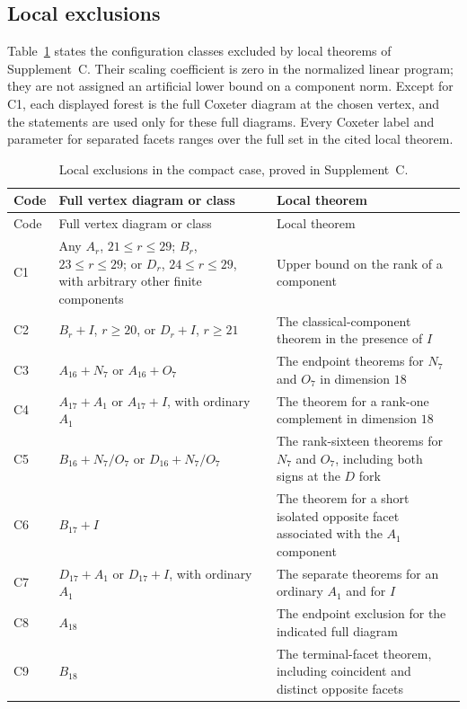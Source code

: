\documentclass[11pt]{article}
\theoremstyle{definition}
\theoremstyle{remark}
\numberwithin{equation}{section}
\begin{document}
\subsection{Local exclusions}
\label{c:local-exits}

Table~\ref{c:local-exit-table} states the configuration classes
excluded by local theorems of Supplement~C. Their scaling coefficient
is zero in the normalized linear program; they are not assigned an
artificial lower bound on a component norm. Except for C1, each displayed forest is the full Coxeter diagram
at the chosen vertex, and the statements are used only for these full diagrams.
Every Coxeter label and parameter for separated facets ranges over
the full set in the cited local theorem.

\begin{longtable}{>{\raggedright\arraybackslash}p{.08\linewidth}
 >{\raggedright\arraybackslash}p{.43\linewidth}
 >{\raggedright\arraybackslash}p{.39\linewidth}}
\caption{Local exclusions in the compact case, proved in Supplement~C.}\label{c:local-exit-table}\\
\toprule
Code&Full vertex diagram or class&Local theorem\\\midrule
\endfirsthead
\toprule Code&Full vertex diagram or class&Local theorem\\\midrule\endhead
C1&Any $A_r$, $21\le r\le29$; $B_r$, $23\le r\le29$;
 or $D_r$, $24\le r\le29$, with arbitrary other finite components&
 Upper bound on the rank of a component\\
C2&$B_r+I$, $r\ge20$, or $D_r+I$, $r\ge21$&
 The classical-component theorem in the presence of $I$\\
C3&$A_{16}+N_7$ or $A_{16}+O_7$&
 The endpoint theorems for $N_7$ and $O_7$ in dimension $18$\\
C4&$A_{17}+A_1$ or $A_{17}+I$, with ordinary $A_1$&
 The theorem for a rank-one complement in dimension $18$\\
C5&$B_{16}+N_7/O_7$ or $D_{16}+N_7/O_7$&
 The rank-sixteen theorems for $N_7$ and $O_7$, including both signs at the $D$ fork\\
C6&$B_{17}+I$&The theorem for a short isolated opposite facet associated with the $A_1$ component\\
C7&$D_{17}+A_1$ or $D_{17}+I$, with ordinary $A_1$&
 The separate theorems for an ordinary $A_1$ and for $I$\\
C8&$A_{18}$&The endpoint exclusion for the indicated full diagram\\
C9&$B_{18}$&The terminal-facet theorem, including coincident and distinct opposite facets\\

\end{longtable}
\end{document}
